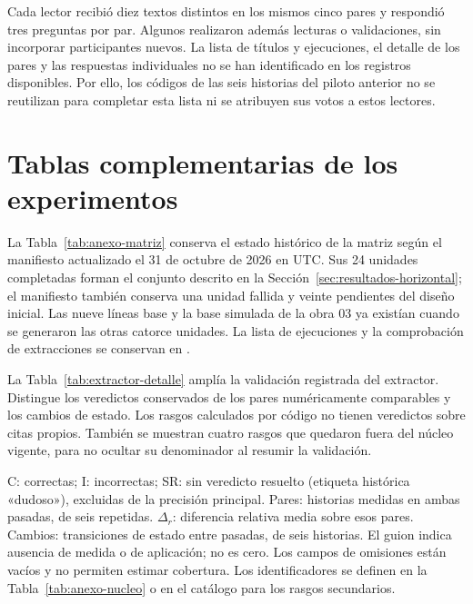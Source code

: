 Cada lector recibió diez textos distintos en los mismos cinco pares y respondió tres preguntas por
par. Algunos realizaron además lecturas o validaciones, sin incorporar participantes nuevos. La
lista de títulos y ejecuciones, el detalle de los pares y las respuestas individuales no se han
identificado en los registros disponibles. Por ello, los códigos de las seis historias del piloto
anterior no se reutilizan para completar esta lista ni se atribuyen sus votos a estos lectores.

\chapter{Tablas complementarias de los experimentos}\label{app:tablas}

La Tabla~\ref{tab:anexo-matriz} conserva el estado histórico de la matriz según el manifiesto
actualizado el 31 de octubre de 2026 en UTC. Sus 24 unidades completadas forman el conjunto descrito
en la Sección~\ref{sec:resultados-horizontal}; el manifiesto también conserva una unidad fallida y
veinte pendientes del diseño inicial. Las nueve líneas base y la base simulada de la obra 03 ya
existían cuando se generaron las otras catorce unidades. La lista de ejecuciones y la comprobación de
extracciones se conservan en .

\begin{table}[htb]
  \centering
  \caption{Estado histórico de la matriz horizontal (manifiesto, 2026-10-31)}
  \label{tab:anexo-matriz}
  \small
  
\end{table}

La Tabla~\ref{tab:extractor-detalle} amplía la validación registrada del extractor. Distingue los
veredictos conservados de los pares numéricamente comparables y los cambios de estado. Los rasgos
calculados por código no tienen veredictos sobre citas propios. También se muestran cuatro rasgos
que quedaron fuera del núcleo vigente, para no ocultar su denominador al resumir la validación.

\begin{table}[p]
  \centering
  \caption{Detalle de las hojas de revisión y del test-retest (2026-10-29)}
  \label{tab:extractor-detalle}
  \small
  
  \par\medskip
  \begin{minipage}{0.96\textwidth}
    \footnotesize
    C: correctas; I: incorrectas; SR: sin veredicto resuelto (etiqueta histórica «dudoso»), excluidas
    de la precisión principal. Pares: historias medidas en ambas pasadas, de seis repetidas.
    $\Delta_r$: diferencia relativa media sobre esos pares. Cambios: transiciones de estado entre
    pasadas, de seis historias. El guion indica ausencia de medida o de aplicación; no es cero.
    Los campos de omisiones están vacíos y no permiten estimar cobertura. Los identificadores se
    definen en la Tabla~\ref{tab:anexo-nucleo} o en el catálogo para los rasgos secundarios.
  \end{minipage}
\end{table}

